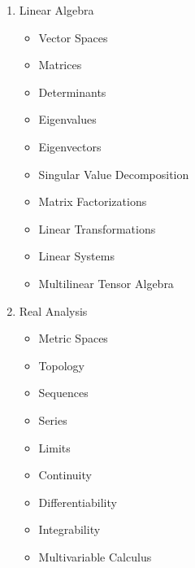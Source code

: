 \documentclass[12pt]{article}
\begin{document}
\begin{enumerate}
    \item Linear Algebra 
    \begin{itemize}
        \item Vector Spaces
        \item Matrices
        \item Determinants
        \item Eigenvalues
        \item Eigenvectors
        \item Singular Value Decomposition
        \item Matrix Factorizations
        \item Linear Transformations
        \item Linear Systems
        \item Multilinear Tensor Algebra
    \end{itemize}

    \item Real Analysis 
    \begin{itemize}
        \item Metric Spaces
        \item Topology
        \item Sequences
        \item Series
        \item Limits
        \item Continuity
        \item Differentiability
        \item Integrability
        \item Multivariable Calculus
    \end{itemize}
\end{enumerate}
\end{document}
